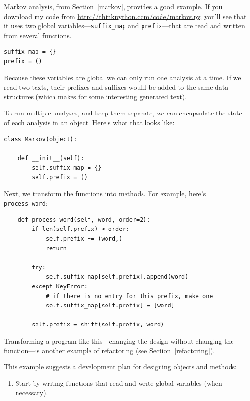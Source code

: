 \documentclass[10pt]{book}
\begin{document}
\begin{CJK}{UTF8}{gbsn}
Markov analysis, from Section~\ref{markov}, provides a good example.
If you download my code from \url{http://thinkpython.com/code/markov.py},
you'll see that it uses two global variables---\verb"suffix_map" and
\verb"prefix"---that are read and written from several functions.

\begin{verbatim}
suffix_map = {}        
prefix = ()            
\end{verbatim}

Because these variables are global
we can only run one analysis
at a time.  If we read two texts, their prefixes and suffixes would
be added to the same data structures (which makes for some interesting
generated text).

To run multiple analyses, and keep them separate, we can encapsulate
the state of each analysis in an object.
Here's what that looks like:

\begin{verbatim}
class Markov(object):

    def __init__(self):
        self.suffix_map = {}
        self.prefix = ()    
\end{verbatim}

Next, we transform the functions into methods.  For example,
here's \verb"process_word":

\begin{verbatim}
    def process_word(self, word, order=2):
        if len(self.prefix) < order:
            self.prefix += (word,)
            return

        try:
            self.suffix_map[self.prefix].append(word)
        except KeyError:
            # if there is no entry for this prefix, make one
            self.suffix_map[self.prefix] = [word]

        self.prefix = shift(self.prefix, word)        
\end{verbatim}

Transforming a program like this---changing the design without
changing the function---is another example of refactoring
(see Section~\ref{refactoring}).

This example suggests a development plan for designing objects and
methods:

\begin{enumerate}

\item Start by writing functions that read and write global
variables (when necessary).


\end{enumerate}
\end{CJK}
\end{document}
